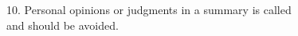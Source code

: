 \documentclass[12pt]{article}
\begin{document}
10. Personal opinions or judgments in a summary is called  \underline{\hspace{4cm}}  \\and should be avoided.

\end{document}
